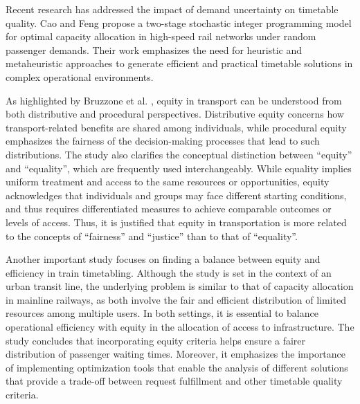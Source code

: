 \documentclass[preprint,12pt]{elsarticle}
\begin{document}
Recent research has addressed the impact of demand uncertainty on timetable quality. Cao and Feng \cite{Cao2020} propose a two-stage stochastic integer programming model for optimal capacity allocation in high-speed rail networks under random passenger demands. Their work emphasizes the need for heuristic and metaheuristic approaches to generate efficient and practical timetable solutions in complex operational environments.

As highlighted by Bruzzone et al. \cite{Bruzzone2023}, equity in transport can be understood from both distributive and procedural perspectives. Distributive equity concerns how transport-related benefits are shared among individuals, while procedural equity emphasizes the fairness of the decision-making processes that lead to such distributions. The study also clarifies the conceptual distinction between ``equity'' and ``equality'', which are frequently used interchangeably. While equality implies uniform treatment and access to the same resources or opportunities, equity acknowledges that individuals and groups may face different starting conditions, and thus requires differentiated measures to achieve comparable outcomes or levels of access. Thus, it is justified that equity in transportation is more related to the concepts of ``fairness'' and ``justice'' than to that of ``equality''.

Another important study \cite{Zhang2019} focuses on finding a balance between equity and efficiency in train timetabling. Although the study is set in the context of an urban transit line, the underlying problem is similar to that of capacity allocation in mainline railways, as both involve the fair and efficient distribution of limited resources among multiple users. In both settings, it is essential to balance operational efficiency with equity in the allocation of access to infrastructure. The study concludes that incorporating equity criteria helps ensure a fairer distribution of passenger waiting times. Moreover, it emphasizes the importance of implementing optimization tools that enable the analysis of different solutions that provide a trade-off between request fulfillment and other timetable quality criteria.
\end{document}
